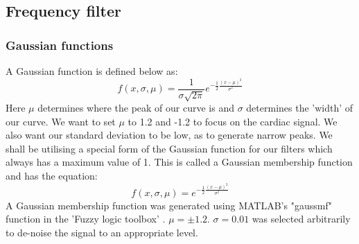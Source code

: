 \documentclass[11pt]{article}
\numberwithin{equation}{section}
\begin{document}
\subsection{Frequency filter}
\subsubsection{Gaussian functions}
A Gaussian function is defined below as:
\begin{equation}
    f(x,\sigma,\mu) = \frac{1}{\sigma\sqrt{2\pi}}e^{-\frac{1}{2}\frac{\left(x - \mu\right)^2}{\sigma^2}}
\end{equation}
Here $\mu$ determines where the peak of our curve is and $\sigma$ determines the 'width' of our curve. We want to set $\mu$ to 1.2 and -1.2 to focus on the cardiac signal. We also want our standard deviation to be low, as to generate narrow peaks. We shall be utilising a special form of the Gaussian function for our filters which always has a maximum value of 1. This is called a Gaussian membership function and has the equation:
\begin{equation}
    f(x,\sigma,\mu) = e^{-\frac{1}{2}\frac{\left(x - \mu\right)^2}{\sigma^2}}
\end{equation}
A Gaussian membership function was generated using MATLAB's "gaussmf" function in the 'Fuzzy logic toolbox' \cite{q3.4.1}. $\mu = \pm1.2$. $\sigma = 0.01$ was selected arbitrarily to de-noise the signal to an appropriate level.

\end{document}
